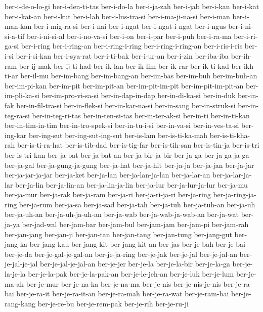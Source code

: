 {ber-i-de-o-lo-gi ber-i-den-ti-tas ber-i-do-la ber-i-ja-zah ber-i-jab
ber-i-kan ber-i-kat ber-i-kat-an ber-i-kut ber-i-lah ber-i-lus-tra-si
ber-i-ma-ji-na-si ber-i-man ber-i-man-kan ber-i-mig-ra-si ber-i-nai
ber-i-ngat ber-i-ngat-i-ngat ber-i-ngus ber-i-ni-si-a-tif ber-i-ni-si-al
ber-i-no-va-si ber-i-on ber-i-par ber-i-puh ber-i-ra-ma ber-i-ri-ga-si
ber-i-ring ber-i-ring-an ber-i-ring-i-ring ber-i-ring-i-ring-an
ber-i-ris-i-ris ber-i-si ber-i-si-kan ber-i-sya-rat ber-i-ti-bak
ber-i-ur-an ber-i-zin ber-iba-iba ber-ih-ram ber-ij-mak ber-ij-ti-had
ber-ik-lan ber-ik-lim ber-ik-rar ber-ik-ti-kad ber-ikh-ti-ar ber-il-mu
ber-im-bang ber-im-bang-an ber-im-bas ber-im-buh ber-im-buh-an
ber-im-pi-kan ber-im-pit ber-im-pit-an ber-im-pit-im-pit
ber-im-pit-im-pit-an ber-im-pli-ka-si ber-im-pro-vi-sa-si
ber-in-dap-in-dap ber-in-di-ka-si ber-in-duk ber-in-fak ber-in-fil-tra-si
ber-in-flek-si ber-in-kar-na-si ber-in-sang ber-in-struk-si
ber-in-teg-ra-si ber-in-teg-ri-tas ber-in-ten-si-tas ber-in-ter-ak-si
ber-in-ti ber-in-ti-kan ber-in-tim-in-tim ber-in-tro-spek-si
ber-in-tu-i-si ber-in-va-si ber-in-ves-ta-si ber-ing-kar ber-ing-sut
ber-ing-sut-ing-sut ber-is-lam ber-is-ti-ka-mah ber-is-ti-kha-rah
ber-is-ti-ra-hat ber-is-tib-dad ber-is-tig-far ber-is-tih-san
ber-is-tin-ja ber-is-tri ber-is-tri-kan ber-ja-bat ber-ja-bat-an
ber-ja-bir-ja-bir ber-ja-ga ber-ja-ga-ja-ga ber-ja-gal ber-ja-gung-ja-gung
ber-ja-hat ber-ja-hit ber-ja-ja ber-ja-jan ber-ja-jar ber-ja-jar-ja-jar
ber-ja-ket ber-ja-lan ber-ja-lan-ja-lan ber-ja-lar-an ber-ja-lar-ja-lar
ber-ja-lin ber-ja-lin-an ber-ja-lin-ja-lin ber-ja-lur ber-ja-lur-ja-lur
ber-ja-mu ber-ja-mur ber-ja-rak ber-ja-ram ber-ja-ri ber-ja-ri-ja-ri
ber-ja-ring ber-ja-ring-ja-ring ber-ja-rum ber-ja-sa ber-ja-sad ber-ja-tah
ber-ja-tuh ber-ja-tuh-an ber-ja-uh ber-ja-uh-an ber-ja-uh-ja-uh-an
ber-ja-wab ber-ja-wab-ja-wab-an ber-ja-wat ber-ja-ya ber-jad-wal
ber-jam-bar ber-jam-bul ber-jam-jam ber-jam-pi ber-jam-rah ber-jan-jang
ber-jan-ji ber-jan-tan ber-jan-tang ber-jan-tung ber-jang-gut ber-jang-ka
ber-jang-kau ber-jang-kit ber-jang-kit-an ber-jas ber-je-bah ber-je-bai
ber-je-da ber-je-gal-je-gal-an ber-je-ja-ring ber-je-jak ber-je-jal
ber-je-jal-an ber-je-jal-je-jal ber-je-jal-je-jal-an ber-je-jer ber-je-la
ber-je-la-bir ber-je-la-ga ber-je-la-je-la ber-je-la-pak ber-je-la-pak-an
ber-je-le-jeh-an ber-je-luk ber-je-lum ber-je-ma-ah ber-je-mur
ber-je-na-ka ber-je-na-ma ber-je-nis ber-je-nis-je-nis ber-je-ra-bai
ber-je-ra-it ber-je-ra-it-an ber-je-ra-mah ber-je-ra-wat ber-je-ram-bai
ber-je-rang-kang ber-je-re-bu ber-je-rem-pak ber-je-rih ber-je-ru-ji
}
